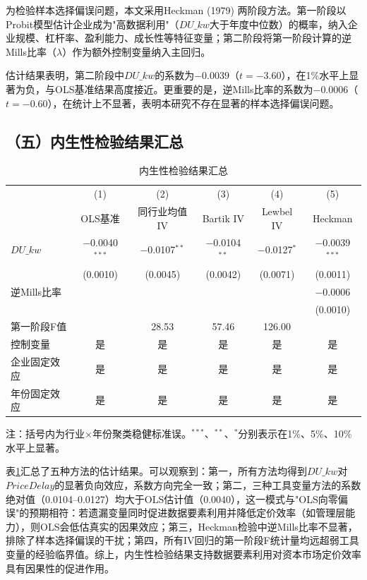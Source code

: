 \documentclass[11pt,a4paper]{article}
\begin{document}
为检验样本选择偏误问题，本文采用Heckman (1979) 两阶段方法。第一阶段以Probit模型估计企业成为"高数据利用"（$DU\_kw$大于年度中位数）的概率，纳入企业规模、杠杆率、盈利能力、成长性等特征变量；第二阶段将第一阶段计算的逆Mills比率（$\lambda$）作为额外控制变量纳入主回归。

估计结果表明，第二阶段中$DU\_kw$的系数为$-0.0039$（$t=-3.60$），在1\%水平上显著为负，与OLS基准结果高度接近。更重要的是，逆Mills比率的系数为$-0.0006$（$t=-0.60$），在统计上不显著，表明本研究不存在显著的样本选择偏误问题。

\subsection*{（五）内生性检验结果汇总}

\begin{table}[htbp]
\centering
\caption{内生性检验结果汇总}
\label{tab:endogeneity}
\vspace{6pt}
\begin{tabular}{lccccc}
\toprule
& (1) & (2) & (3) & (4) & (5) \\
& OLS基准 & 同行业均值IV & Bartik IV & Lewbel IV & Heckman \\
\midrule
$DU\_kw$ & $-$0.0040$^{***}$ & $-$0.0107$^{**}$ & $-$0.0104$^{**}$ & $-$0.0127$^{*}$ & $-$0.0039$^{***}$ \\
& (0.0010) & (0.0045) & (0.0042) & (0.0071) & (0.0011) \\[6pt]
逆Mills比率 & & & & & $-$0.0006 \\
& & & & & (0.0010) \\[6pt]
第一阶段F值 & & 28.53 & 57.46 & 126.00 & \\[3pt]
\midrule
控制变量 & 是 & 是 & 是 & 是 & 是 \\
企业固定效应 & 是 & 是 & 是 & 是 & 是 \\
年份固定效应 & 是 & 是 & 是 & 是 & 是 \\
\bottomrule
\end{tabular}

\vspace{6pt}
\small 注：括号内为行业$\times$年份聚类稳健标准误。$^{***}$、$^{**}$、$^{*}$分别表示在1\%、5\%、10\%水平上显著。
\end{table}

表\ref{tab:endogeneity}汇总了五种方法的估计结果。可以观察到：第一，所有方法均得到$DU\_kw$对$PriceDelay$的显著负向效应，系数方向完全一致；第二，三种工具变量方法的系数绝对值（0.0104--0.0127）均大于OLS估计值（0.0040），这一模式与"OLS向零偏误"的预期相符：若遗漏变量同时促进数据要素利用并降低定价效率（如管理层能力），则OLS会低估真实的因果效应；第三，Heckman检验中逆Mills比率不显著，排除了样本选择偏误的干扰；第四，所有IV回归的第一阶段F统计量均远超弱工具变量的经验临界值。综上，内生性检验结果支持数据要素利用对资本市场定价效率具有因果性的促进作用。
\end{document}
